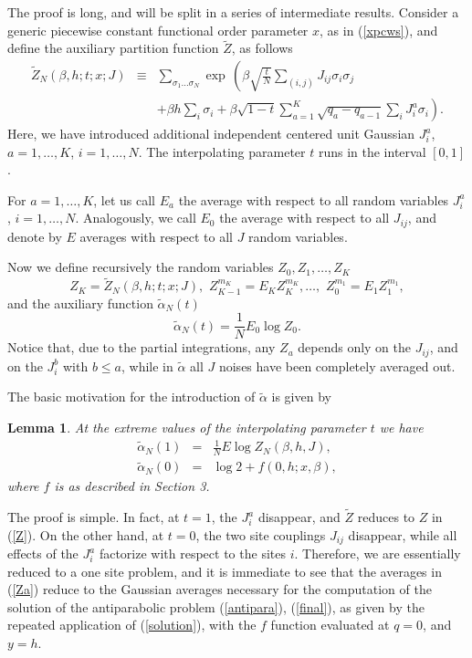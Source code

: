 \documentclass[a4paper,12pt]{article}
\newtheorem{lemma}{Lemma}
\begin{document}
The proof is long, and will be split in a series of intermediate results. 
Consider a generic piecewise constant functional order parameter $x$, as in 
(\ref{xpcws}), and define the auxiliary partition function $\tilde Z$, as 
follows
\begin{eqnarray}
\nonumber
\tilde{Z}_{N}(\beta,h;t;x;J)&\equiv&
\sum_{\sigma_1\dots\sigma_N}\exp\,\left(\beta\sqrt{\frac tN}\sum_{(i,j)}J_{ij}
\sigma_i\sigma_j\right.\\
\label{Ztilde}
&&\left.+\beta h\sum_{i}\sigma_i +\beta\sqrt{1-t}\sum_{a=1}^{K}\sqrt{q_a-q_{a-1}}
\sum_{i}J^{a}_{i}\sigma_i\right).
\end{eqnarray}
Here, we have introduced additional independent centered unit Gaussian 
$J^{a}_{i}$, $a=1,\dots, K$, $i=1,\dots,N$. The interpolating parameter $t$ 
runs in the interval $[0,1]$.

For $a=1,\dots, K$, let us call $E_a$ the average with respect to all 
random variables $J^{a}_{i}$, $i=1,\dots, N$. Analogously, we call $E_0$ 
the average with respect to all $J_{ij}$, and denote by $E$ averages with 
respect to all $J$ random variables.

Now we define recursively the random variables $Z_0,Z_1,\dots,Z_K$
\begin{equation}
\label{Za}
Z_{K}=\tilde{Z}_{N}(\beta,h;t;x;J),\,\,Z_{K-1}^{m_{K}}=E_{K}Z_{K}^{m_{K}}, 
\ldots,\,\,Z_{0}^{m_{1}}=E_{1}Z_{1}^{m_{1}},
\end{equation}   
and the auxiliary function $\tilde\alpha_{N}(t)$
\begin{equation}
\label{atilde}
\tilde\alpha_{N}(t)=\frac{1}{N}E_0 \log Z_{0}.
\end{equation}
Notice that, due to the partial integrations, any $Z_a$ depends only on 
the $J_{ij}$, and on the $J^{b}_{i}$ with $b\le a$, while in $\tilde\alpha$ 
all $J$ noises have been completely averaged out.

The basic motivation for the introduction of $\tilde\alpha$ is given by
\begin{lemma}
\label{inter}
At the extreme values of the interpolating parameter $t$ we have
\begin{eqnarray}\label{t1}
\tilde\alpha_{N}(1)&=&\frac{1}{N}E\log Z_{N}(\beta,h,J),\\
\label{t0}
\tilde\alpha_{N}(0)&=& \log 2 + f(0,h;x,\beta),
\end{eqnarray}
where $f$ is as described in Section 3.
\end{lemma}
The proof is simple. In fact, at $t=1$, the $J^{a}_{i}$ disappear, and 
$\tilde Z$ reduces to $Z$ in (\ref{Z}). On the other hand, at $t=0$, the 
two site couplings $J_{ij}$ disappear, while all effects of the 
$J^{a}_{i}$ factorize with respect to the sites $i$. Therefore, we are 
essentially reduced to a one site problem, and it is immediate to see that 
the averages in (\ref{Za}) reduce to the Gaussian averages necessary for 
the computation of the solution of the antiparabolic problem 
(\ref{antipara}), (\ref{final}), as given  by the repeated 
application of (\ref{solution}), 
with the $f$ function evaluated at $q=0$, 
and $y=h$.
\end{document}
